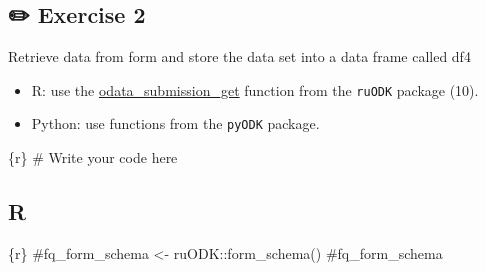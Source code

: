 \documentclass[
  letterpaper,
  DIV=11,
  numbers=noendperiod,
  oneside]{scrreprt}
\newenvironment{Shaded}{\begin{snugshade}}{\end{snugshade}}
\newcommand{\CommentTok}[1]{\textcolor[rgb]{0.37,0.37,0.37}{#1}}
\newcommand{\InformationTok}[1]{\textcolor[rgb]{0.37,0.37,0.37}{#1}}
\providecommand{\tightlist}{%
  \setlength{\itemsep}{0pt}\setlength{\parskip}{0pt}}\usepackage{longtable,booktabs,array}
\begin{document}
\subsection{\texorpdfstring{{✏️} Exercise 2}{✏️ Exercise 2}}

Retrieve data from form and store the data set into a data frame called
df4

\begin{tcolorbox}[enhanced jigsaw, coltitle=black, opacityback=0, title=\textcolor{quarto-callout-tip-color}{\faLightbulb}\hspace{0.5em}{Tip}, toprule=.15mm, bottomtitle=1mm, colbacktitle=quarto-callout-tip-color!10!white, colframe=quarto-callout-tip-color-frame, left=2mm, opacitybacktitle=0.6, bottomrule=.15mm, arc=.35mm, toptitle=1mm, colback=white, titlerule=0mm, breakable, leftrule=.75mm, rightrule=.15mm]

\begin{itemize}
\tightlist
\item
  R: use the
  \href{https://docs.ropensci.org/ruODK/reference/odata_submission_get.html}{odata\_submission\_get}
  function from the \texttt{ruODK} package (10).
\item
  Python: use functions from the \texttt{pyODK} package.
\end{itemize}

\end{tcolorbox}

\begin{Shaded}
\begin{Highlighting}[]
\InformationTok{\textasciigrave{}\textasciigrave{}\textasciigrave{}\{r\}}
\CommentTok{\# Write your code here}
\InformationTok{\textasciigrave{}\textasciigrave{}\textasciigrave{}}
\end{Highlighting}
\end{Shaded}

\subsection{R}

\begin{Shaded}
\begin{Highlighting}[]
\InformationTok{\textasciigrave{}\textasciigrave{}\textasciigrave{}\{r\}}
\CommentTok{\#fq\_form\_schema \textless{}{-} ruODK::form\_schema()}
\CommentTok{\#fq\_form\_schema}
\InformationTok{\textasciigrave{}\textasciigrave{}\textasciigrave{}}
\end{Highlighting}
\end{Shaded}
\end{document}
